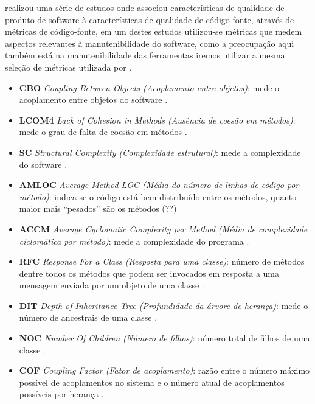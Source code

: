 \documentclass[qual, classic, a4paper]{ufbathesis}
\begin{document}
 realizou uma série de estudos onde associou
características de qualidade de produto de software à características de
qualidade de código-fonte, através de métricas de código-fonte, em um destes estudos
utilizou-se métricas que medem aspectos relevantes à manutenibilidade do
software, como a preocupação aqui também está na manutenibilidade
das ferramentas iremos utilizar a mesma seleção de métricas utilizada por
.

\begin{itemize}

  \item {\bf CBO} {\it Coupling Between Objects (Acoplamento entre objetos)}:
    mede o acoplamento entre objetos do software \cite{Chidamber1994}.

  \item {\bf LCOM4} {\it Lack of Cohesion in Methods (Ausência de coesão em
    métodos)}: mede o grau de falta de coesão em métodos \cite{Hitz1995}.

  \item {\bf SC} {\it Structural Complexity (Complexidade estrutural)}: mede a
    complexidade do software \cite{Darcy2005}.

  \item {\bf AMLOC} {\it Average Method LOC (Média do número de linhas de
    código por método)}: indica se o código está bem distribuído entre os
    métodos, quanto maior mais ``pesados'' são os métodos (??)

  \item {\bf ACCM} {\it Average Cyclomatic Complexity per Method (Média de
    complexidade ciclomática por método)}: mede a complexidade do programa
    \cite{McCabe1976}.

  \item {\bf RFC} {\it Response For a Class (Resposta para uma classe)}:
    número de métodos dentre todos os métodos que podem ser invocados em
    resposta a uma mensagem enviada por um objeto de uma classe
    \cite{Sharble1993}.

  \item {\bf DIT} {\it Depth of Inheritance Tree (Profundidade da árvore de
    herança)}: mede o número de ancestrais de uma classe \cite{Shih1997}.

  \item {\bf NOC} {\it Number Of Children (Número de filhos)}: número total de
    filhos de uma classe \cite{Rosenberg1997}.

  \item {\bf COF} {\it Coupling Factor (Fator de acoplamento)}: razão entre o
    número máximo possível de acoplamentos no sistema e o número atual de
    acoplamentos possíveis por herança \cite{Harrison1998}.

\end{itemize}
\end{document}
